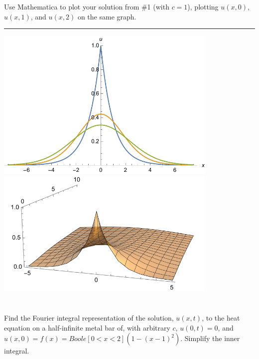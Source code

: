 \documentclass[10pt]{article}
\begin{document}
\noindent
Use Mathematica to plot your solution from \#1 (with $ c = 1 $), 
plotting $ u(x,0) $, $ u(x,1) $, and $ u(x,2) $ on the same graph. \\
\vspace{2.5mm}

\hrule 

\vspace{7.5mm}

\begin{center}
    \includegraphics[width=0.8\textwidth]{img/2_1.pdf}
    \vspace{7.5mm}
    \includegraphics[width=0.8\textwidth]{img/2_2.pdf}
\end{center}

\newpage

\section{\underline{}}
\label{sec: Problem 3}

\noindent
Find the Fourier integral representation of the solution, $ u(x,t) $, 
to the heat equation on a half-infinite metal bar of, with arbitrary $ c $, 
$ u(0,t) = 0 $, and $ u(x,0) = f(x) = Boole[0 < x < 2] (1 - (x - 1)^2) $. 
Simplify the inner integral.  \\
\vspace{2.5mm}
\end{document}
